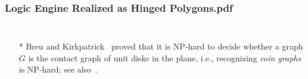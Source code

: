 \documentclass{beamer}
\begin{document}
\begin{frame} \frametitle{Logic Engine Realized as Hinged Polygons.pdf}
    \begin{columns}[c]
        \begin{itemize}
            \item[*] Breu and Kirkpatrick~\cite{BK98} proved that it is NP-hard to decide whether a graph $G$ is the contact graph of unit disks in the plane, i.e., recognizing \emph{coin graphs} is NP-hard; see also~\cite{BET+99}.
        \end{itemize}
    \end{columns}
\end{frame}
\end{document}
